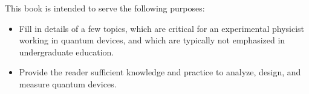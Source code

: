 
This book is intended to serve the following purposes:
\begin{itemize}
  \item Fill in details of a few topics, which are critical for an experimental physicist working in quantum devices, and which are typically not emphasized in undergraduate education.
  \item Provide the reader sufficient knowledge and practice to analyze, design, and measure quantum devices.
\end{itemize}
